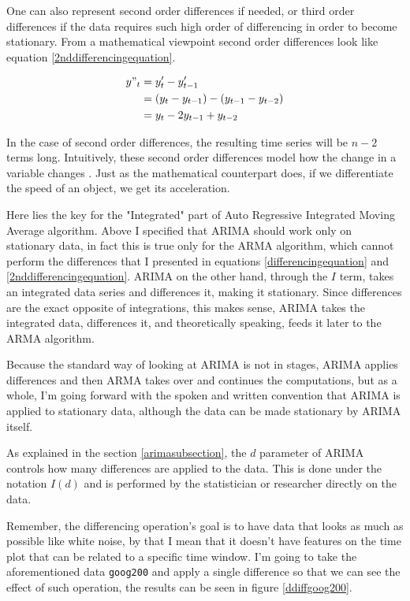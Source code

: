 \documentclass[12pt,a4paper,titlepage]{report}
\begin{document}
One can also represent second order differences if needed, or third order differences if the data requires such high order of differencing in order to become stationary. From a mathematical viewpoint second order differences look like equation \ref{2nddifferencingequation}.

\begin{equation}
\begin{split}
y"_{t} &= y'_{t} - y'_{t-1} \\
       &= (y_{t} - y_{t-1}) - (y_{t-1} - y_{t-2}) \\
       &= y_{t} - 2 y_{t-1} + y_{t-2} \\
\end{split}
\label{2nddifferencingequation}
\end{equation}

In the case of second order differences, the resulting time series will be $ n - 2 $ terms long. Intuitively, these second order differences model how the change in a variable changes \cite{fpp2stationarity}. Just as the mathematical counterpart does, if we differentiate the speed of an object, we get its acceleration.

Here lies the key for the "Integrated" part of Auto Regressive Integrated Moving Average algorithm. Above I specified that ARIMA should work only on stationary data, in fact this is true only for the ARMA algorithm, which cannot perform the differences that I presented in equations \ref{differencingequation} and \ref{2nddifferencingequation}. ARIMA on the other hand, through the $ I $ term, takes an integrated data series and differences it, making it stationary. Since differences are the exact opposite of integrations, this makes sense, ARIMA takes the integrated data, differences it, and theoretically speaking, feeds it later to the ARMA algorithm.

Because the standard way of looking at ARIMA is not in stages, ARIMA applies differences and then ARMA takes over and continues the computations, but as a whole, I'm going forward with the spoken and written convention
that ARIMA is applied to stationary data, although the data can be made stationary by ARIMA itself.

As explained in the section \ref{arimasubsection}, the $ d $ parameter of ARIMA controls how many differences are applied to the data. This is done under the notation $ I(d) $ and is performed by the statistician or researcher directly on the data.

Remember, the differencing operation's goal is to have data that looks as much as possible like white noise, by that I mean that it doesn't have features on the time plot that can be related to a specific time window.
I'm going to take the aforementioned data \texttt{goog200} and apply a single difference so that we can see the effect of such operation, the results can be seen in figure \ref{ddiffgoog200}.
\end{document}
